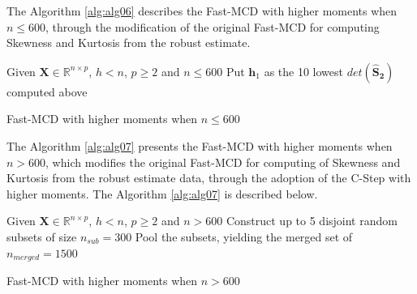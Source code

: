 \documentclass[review]{elsarticle}
\begin{document}
The Algorithm \ref{alg:alg06} describes the Fast-MCD with higher moments when $n \leq 600$, through the modification of the original Fast-MCD for computing Skewness and Kurtosis from the robust estimate.
    
\begin{algorithm}
	\label{alg:alg06}
	\scriptsize
	\SetAlgoLined
	Given $\boldsymbol{X} \in \mathbb{R}^{n \times p}$, $h < n$, $p \geq 2$ and $n \leq 600$\;
	Put $\boldsymbol{h}_1$ as the 10 lowest $det(\boldsymbol{\hat{S}_2})$ computed above\;
	\caption{Fast-MCD with higher moments when $n \leq 600$}
\end{algorithm}

The Algorithm \ref{alg:alg07} presents the Fast-MCD with higher moments when $n > 600$, which modifies the original Fast-MCD for computing of Skewness and Kurtosis from the robust estimate data, through the adoption of the C-Step with higher moments. The Algorithm \ref{alg:alg07} is described below.

\begin{algorithm}
	\label{alg:alg07}
	\scriptsize
	\SetAlgoLined
	Given $\boldsymbol{X} \in \mathbb{R}^{n \times p}$, $h < n$, $p \geq 2$ and $n > 600$\;
	Construct up to 5 disjoint random subsets of size $n_{sub} = 300$\;
	Pool the subsets, yielding the merged set of $n_{merged} = 1500$\;
	\caption{Fast-MCD with higher moments when $n > 600$}
\end{algorithm}
\end{document}
